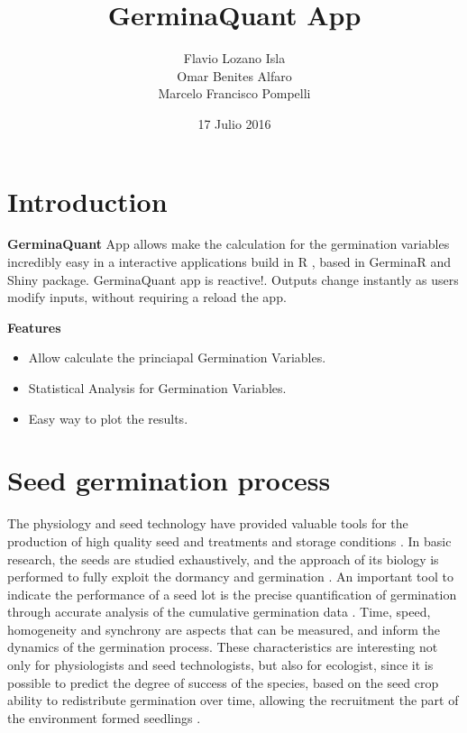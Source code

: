 \documentclass[]{book}
\title{GerminaQuant App}
\author{Flavio Lozano Isla \\ Omar Benites Alfaro \\ Marcelo Francisco Pompelli}
\date{17 Julio 2016}
\providecommand{\tightlist}{%
  \setlength{\itemsep}{0pt}\setlength{\parskip}{0pt}}
\begin{document}
\maketitle

{
\setcounter{tocdepth}{1}
\tableofcontents
}
\chapter*{Introduction}\label{introduction}

\textbf{GerminaQuant} App allows make the calculation for the
germination variables incredibly easy in a interactive applications
build in R \citep{R-base}, based in GerminaR and Shiny \citep{R-shiny}
package. GerminaQuant app is reactive!. Outputs change instantly as
users modify inputs, without requiring a reload the app.

\textbf{Features}

\begin{itemize}
\tightlist
\item
  Allow calculate the princiapal Germination Variables.
\item
  Statistical Analysis for Germination Variables.
\item
  Easy way to plot the results.
\end{itemize}

\chapter{Seed germination process}\label{seed-germination-process}

The physiology and seed technology have provided valuable tools for the
production of high quality seed and treatments and storage conditions
\citep{Marcos-Filho1998}. In basic research, the seeds are studied
exhaustively, and the approach of its biology is performed to fully
exploit the dormancy and germination \citep{Penfield2009}. An important
tool to indicate the performance of a seed lot is the precise
quantification of germination through accurate analysis of the
cumulative germination data \citep{Joosen2010}. Time, speed, homogeneity
and synchrony are aspects that can be measured, and inform the dynamics
of the germination process. These characteristics are interesting not
only for physiologists and seed technologists, but also for ecologist,
since it is possible to predict the degree of success of the species,
based on the seed crop ability to redistribute germination over time,
allowing the recruitment the part of the environment formed seedlings
\citep{Ranal2006}.
\end{document}
